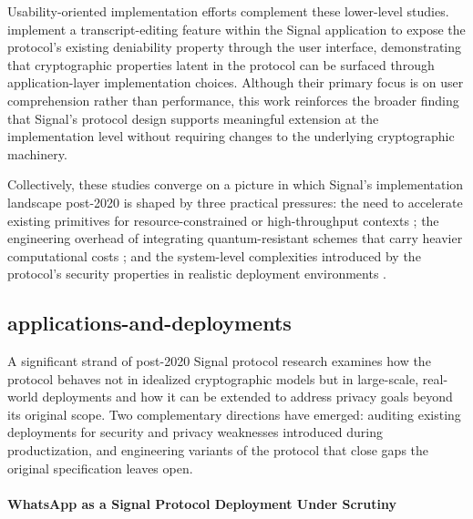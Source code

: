 Usability-oriented implementation efforts complement these lower-level studies. \textcite{rajendran2024} implement a transcript-editing feature within the Signal application to expose the protocol's existing deniability property through the user interface, demonstrating that cryptographic properties latent in the protocol can be surfaced through application-layer implementation choices. Although their primary focus is on user comprehension rather than performance, this work reinforces the broader finding that Signal's protocol design supports meaningful extension at the implementation level without requiring changes to the underlying cryptographic machinery.

Collectively, these studies converge on a picture in which Signal's implementation landscape post-2020 is shaped by three practical pressures: the need to accelerate existing primitives for resource-constrained or high-throughput contexts \parencite{bhati2024}; the engineering overhead of integrating quantum-resistant schemes that carry heavier computational costs \parencite{jankowski2025,angom2025}; and the system-level complexities introduced by the protocol's security properties in realistic deployment environments \parencite{almari2024}.

\subsection{applications-and-deployments}

A significant strand of post-2020 Signal protocol research examines how the protocol behaves not in idealized cryptographic models but in large-scale, real-world deployments and how it can be extended to address privacy goals beyond its original scope. Two complementary directions have emerged: auditing existing deployments for security and privacy weaknesses introduced during productization, and engineering variants of the protocol that close gaps the original specification leaves open.

\paragraph{WhatsApp as a Signal Protocol Deployment Under Scrutiny}

